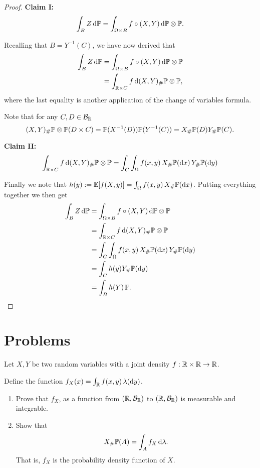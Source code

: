 \begin{proof}
\textbf{Claim I:}
\[
	\int_{B} Z \, \mathrm{d} \mathbb P = \int_{\Omega \times B} f \circ (X,Y) \, \mathrm{d} \mathbb P \otimes \mathbb P.
\]

Recalling that $B = Y^{-1}(C)$, we have now derived that
\begin{align*}
	\int_{B} Z \, \mathrm{d} \mathbb P &= \int_{\Omega \times B} f \circ (X,Y) \, \mathrm{d} \mathbb P \otimes \mathbb P\\
	&= \int_{\mathbb R \times C} f \, \mathrm{d} (X,Y)_\# \mathbb P \otimes \mathbb P,
\end{align*}
where the last equality is another application of the change of variables formula.

Note that for any $C, D \in \mathcal B_{\mathbb R}$
\[
	(X,Y)_\# \mathbb P \otimes \mathbb P(D \times C) = \mathbb P(X^{-1}(D)) \mathbb P(Y^{-1}(C)) 
	= X_\# \mathbb P(D) Y_\# \mathbb P(C).
\]

\textbf{Claim II:}
\[
	\int_{\mathbb R \times C} f \, \mathrm{d} (X,Y)_\# \mathbb P \otimes \mathbb P
	= \int_C \int_\Omega f(x,y) \, X_\#\mathbb P(\mathrm{d} x) \, Y_\# \mathbb P (\mathrm{d} y)
\]

Finally we note that $h(y) := \mathbb E[f(X,y)] = \int_\Omega f(x,y) \, X_\#\mathbb P(\mathrm{d} x)$. Putting everything together we then get
\begin{align*}
	\int_{B} Z \, \mathrm{d} \mathbb P &= \int_{\Omega \times B} f \circ (X,Y) \, \mathrm{d} \mathbb P \otimes \mathbb P\\
	&= \int_{\mathbb R \times C} f \, \mathrm{d} (X,Y)_\# \mathbb P \otimes \mathbb P\\
	&= \int_C \int_\Omega f(x,y) \, X_\#\mathbb P(\mathrm{d} x) \, Y_\# \mathbb P (\mathrm{d} y)\\
	&= \int_C h(y) Y_\# \mathbb P(\mathrm{d} y) \\
	&= \int_B h(Y) \, \mathbb P.
\end{align*}

\end{proof}


\section{Problems}


\begin{problem}\label{prb:joint_pdfs}
Let $X,Y$ be two random variables with a joint density $f : \mathbb R \times \mathbb R \to \mathbb R$. 

Define the function $f_X(x) = \int_{\mathbb R} f(x,y) \, \lambda(\mathrm{d} y)$.
\begin{enumerate}[label={(\alph*)}]
\item Prove that $f_X$, as a function from $(\mathbb R, \mathcal B_{\mathbb R})$ to $(\mathbb R, \mathcal B_{\mathbb R})$ is measurable and integrable.
\item Show that
\[
	X_\# \mathbb P (A) = \int_A f_X \, \mathrm{d} \lambda.
\]
That is, $f_X$ is the probability density function of $X$.
\end{enumerate}
\end{problem}

